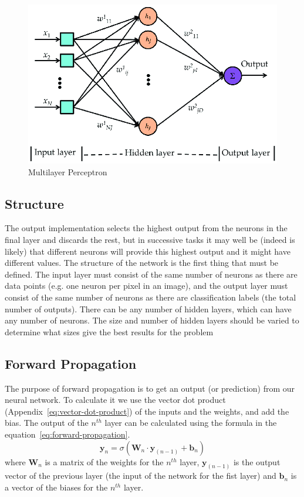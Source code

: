 \documentclass[titlepage]{article}
\begin{document}
\begin{figure}[h!]
    \includegraphics[width=\textwidth]{assets/multilayer perceptron.png}
    \caption{Multilayer Perceptron}
    \label{fig:multilayer-perceptron}
\end{figure}
\subsection{Structure}
The output implementation selects the highest output from the neurons in the final layer and discards the rest, but in successive tasks it may well be (indeed is likely) that different neurons will provide this highest output and it might have different values. The structure of the network is the first thing that must be defined. The input layer must consist of the same number of neurons as there are data points (e.g. one neuron per pixel in an image), and the output layer must consist of the same number of neurons as there are classification labels (the total number of outputs). There can be any number of hidden layers, which can have any number of neurons. The size and number of hidden layers should be varied to determine what sizes give the best results for the problem

\subsection{Forward Propagation}
The purpose of forward propagation is to get an output (or prediction) from our neural network. To calculate it we use the vector dot product (Appendix~\ref{eq:vector-dot-product}) of the inputs and the weights, and add the bias. The output of the $n^{th}$ layer can be calculated using the formula in the equation~\ref{eq:forward-propagation}.
\begin{equation}
    \textbf{y}_n = \sigma{(\textbf{W}_n\cdot\textbf{y}_{(n-1)} + \textbf{b}_n)}
    \label{eq:forward-propagation}
\end{equation}
where $\textbf{W}_n$ is a matrix of the weights for the $n^{th}$ layer, $\textbf{y}_{(n-1)}$ is the output vector of the previous layer (the input of the network for the fist layer) and $\textbf{b}_n$ is a vector of the biases for the $n^{th}$ layer.
\end{document}
